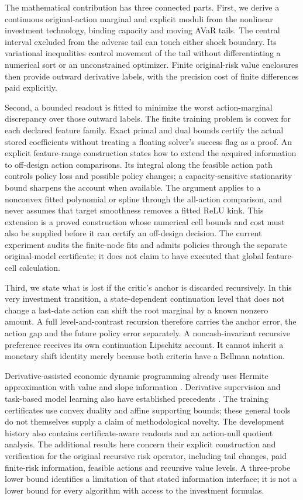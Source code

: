 The mathematical contribution has three connected parts. First, we derive a
continuous original-action marginal and explicit moduli from the nonlinear
investment technology, binding capacity and moving AVaR tails. The central
interval excluded from the adverse tail can touch either shock boundary. Its variational inequalities
control movement of the tail without differentiating a numerical sort or an
unconstrained optimizer. Finite original-risk value enclosures then provide
outward derivative labels, with the precision cost of finite differences paid
explicitly.

Second, a bounded readout is fitted to minimize the worst action-marginal discrepancy over
those outward labels. The finite training problem is convex for each declared
feature family. Exact primal and dual bounds certify the actual stored
coefficients without treating a floating solver's success flag as a proof.
An explicit feature-range construction states how to extend the acquired
information to off-design action comparisons. Its integral along the feasible action path
controls policy loss and possible policy changes; a capacity-sensitive
stationarity bound sharpens the account when available. The argument applies
to a nonconvex fitted polynomial or spline through the all-action comparison,
and never assumes that target smoothness removes a fitted ReLU kink. This
extension is a proved construction whose numerical cell bounds and cost must
also be supplied before it can certify an off-design decision. The current
experiment audits the finite-node fits and admits policies through the
separate original-model certificate; it does not claim to have executed that
global feature-cell calculation.

Third, we state what is lost if the critic's anchor is discarded recursively.
In this very investment transition, a state-dependent continuation level that
does not change a last-date action can shift the root marginal by a known
nonzero amount. A full level-and-contrast recursion therefore carries the
anchor error, the action gap and the future policy error separately. A
noncash-invariant recursive preference receives its own continuation
Lipschitz account. It cannot inherit a monetary shift identity merely because
both criteria have a Bellman notation.

Derivative-assisted economic dynamic programming already uses Hermite
approximation with value and slope information \citep{CaiJudd2015}.
Derivative supervision and task-based model learning also have established
precedents \citep{Czarnecki2017Sobolev,Donti2017Task,ElmachtoubGrigas2022}.
The training certificates use convex duality and affine supporting bounds;
these general tools do not themselves supply a claim of methodological novelty.
The development history also contains certificate-aware readouts and an
action-null quotient analysis. The additional results here concern their
explicit construction and verification for the original recursive risk
operator, including tail changes, paid finite-risk information, feasible
actions and recursive value levels. A three-probe lower bound identifies a
limitation of that stated information interface; it is not a lower bound for
every algorithm with access to the investment formulas.

